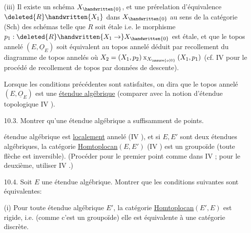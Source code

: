(iii) Il existe un schéma $X_{\handwritten{0}}$, et une prérelation d'équivalence $\deleted{R}\handwritten{X_1}$ dans $X_{\handwritten{0}}$ au sens de la catégorie (Sch) des schémas \handwritten{,} telle que $R$ soit étale i.e. le morphisme $p_1:\deleted{R}\handwritten{X_1\to}X_{\handwritten{0}}$ est étale, et que le topos annelé $(E,\underline{O}_E)$ soit équivalent au topos annelé déduit par recollement du diagramme  de topos annelés  
\margin{\handwritten{\unsure{$\chi$|$\times$}}}
où $X_2=(X_1,p_2)\mathbin{\mathrm{x}}_{X_{\unsure{o|0}}}(X_1,p_1)$ (cf. IV  pour le procédé de recollement de topos par données de descente).

Lorsque les conditions précédentes sont satisfaites, on dira que le topos annelé $(E,\underline{O}_E)$ est une \uline{étendue algébrique} (comparer avec la notion d'étendue topologique IV ).
\margin{\handwritten{$\times$}}

10.3. Montrer qu'une étendue algébrique a suffisamment de points.

\margin{\handwritten{$\times$}}
 étendue algébrique est \uline{localement} annelé (IV ), et si $E,E'$ sont deux étendues algébriques, la catégorie \uline{Homtoplocan}$(E,E')$ (IV ) est un groupoïde (toute flèche est inversible). (Procéder pour le premier point comme dans IV ; pour le deuxième, utiliser IV \hspace{2em}.)
\margin{\handwritten{$\times\quad\times$}}

10.4.  Soit $E$ une étendue algébrique. Montrer que les conditions suivantes sont équivalentes:
\margin{\handwritten{$\times$}}

(i) Pour toute étendue algébrique $E'$, la catégorie  \uline{Homtoplocan}$(E',E)$ est rigide, i.e.  (comme c'est un groupoïde) elle est équivalente à une catégorie discrète.

